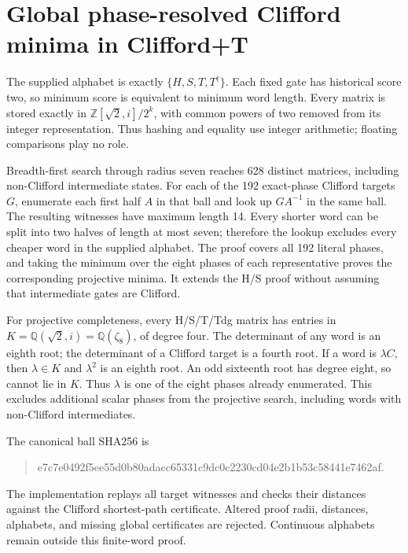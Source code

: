 \documentclass[11pt]{article}
\begin{document}
\section{Global phase-resolved Clifford minima in Clifford+T}
The supplied alphabet is exactly $\{H,S,T,T^\dagger\}$. Each fixed gate has
historical score two, so minimum score is equivalent to minimum word length.
Every matrix is stored exactly in $\mathbb Z[\sqrt2,i]/2^k$, with common powers
of two removed from its integer representation. Thus hashing and equality
use integer arithmetic; floating comparisons play no role.

Breadth-first search through radius seven reaches 628 distinct matrices,
including non-Clifford intermediate states. For each of the 192 exact-phase
Clifford targets $G$, enumerate each first half $A$ in that ball and look up
$GA^{-1}$ in the same ball. The resulting witnesses have maximum length 14.
Every shorter word can be split into two halves of length at most seven;
therefore the lookup excludes every cheaper word in the supplied alphabet.
The proof covers all 192 literal phases, and taking the minimum over the eight
phases of each representative proves the corresponding projective minima.
It extends the H/S proof without assuming that intermediate gates are Clifford.

For projective completeness, every H/S/T/Tdg matrix has entries in
$K=\mathbb Q(\sqrt2,i)=\mathbb Q(\zeta_8)$, of degree four. The determinant
of any word is an eighth root; the determinant of a Clifford target is a
fourth root. If a word is $\lambda C$, then $\lambda\in K$ and
$\lambda^2$ is an eighth root. An odd sixteenth root has degree eight,
so cannot lie in $K$. Thus $\lambda$ is one of the eight phases already
enumerated. This excludes additional scalar phases from the projective
search, including words with non-Clifford intermediates.


The canonical ball SHA256 is
\begin{quote}\small\ttfamily
 e7c7e0492f5ee55d0b80adacc65331c9dc0c2230cd04e2b1b53c58441e7462af.
\end{quote}
The implementation replays all target witnesses and checks their distances
against the Clifford shortest-path certificate. Altered proof radii,
distances, alphabets, and missing global certificates are rejected.
Continuous alphabets remain outside this finite-word proof.
\end{document}
